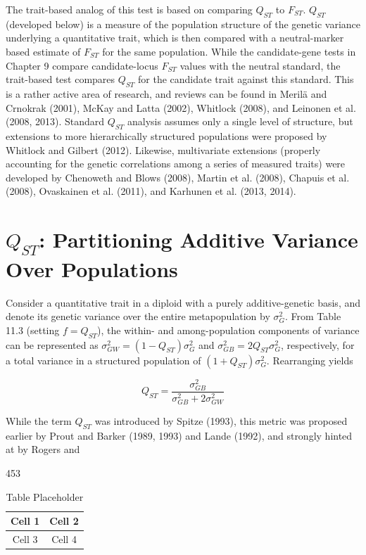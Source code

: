 \documentclass{article}
\begin{document}
The trait-based analog of this test is based on comparing  $ Q_{ST} $ to  $ F_{ST} $.  $ Q_{ST} $ (developed below) is a measure of the population structure of the genetic variance underlying a quantitative trait, which is then compared with a neutral-marker based estimate of  $ F_{ST} $ for the same population. While the candidate-gene tests in Chapter 9 compare candidate-locus  $ F_{ST} $ values with the neutral standard, the trait-based test compares  $ Q_{ST} $ for the candidate trait against this standard. This is a rather active area of research, and reviews can be found in Merilä and Crnokrak (2001), McKay and Latta (2002), Whitlock (2008), and Leinonen et al. (2008, 2013). Standard  $ Q_{ST} $ analysis assumes only a single level of structure, but extensions to more hierarchically structured populations were proposed by Whitlock and Gilbert (2012). Likewise, multivariate extensions (properly accounting for the genetic correlations among a series of measured traits) were developed by Chenoweth and Blows (2008), Martin et al. (2008), Chapuis et al. (2008), Ovaskainen et al. (2011), and Karhunen et al. (2013, 2014).

\section{ $ Q_{ST} $: Partitioning Additive Variance Over Populations}
Consider a quantitative trait in a diploid with a purely additive-genetic basis, and denote its genetic variance over the entire metapopulation by  $ \sigma_G^2 $. From Table 11.3 (setting  $ f = Q_{ST} $), the within- and among-population components of variance can be represented as  $ \sigma_{GW}^2 = (1 - Q_{ST})\sigma_G^2 $ and  $ \sigma_{GB}^2 = 2Q_{ST}\sigma_G^2 $, respectively, for a total variance in a structured population of  $ (1 + Q_{ST})\sigma_G^2 $. Rearranging yields

\begin{equation}
Q_{ST}=\frac{\sigma_{GB}^{2}}{\sigma_{GB}^{2}+2\sigma_{GW}^{2}}
\tag{12.26a}
\label{eq:12_26a}
\end{equation}

While the term  $ Q_{ST} $ was introduced by Spitze (1993), this metric was proposed earlier by Prout and Barker (1989, 1993) and Lande (1992), and strongly hinted at by Rogers and

453

\begin{table}[h]
\centering
\begin{tabular}{|c|c|}
\hline
Cell 1 & Cell 2 \\
\hline
Cell 3 & Cell 4 \\
\hline
\end{tabular}
\caption{Table Placeholder}
\end{table}
\end{document}

